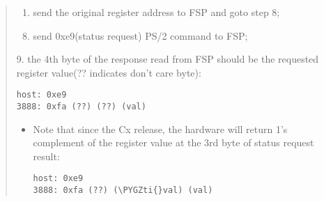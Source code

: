 \documentclass[a4paper,8pt,english]{sphinxmanual}
\def\PYGZti{\char`\~}
\begin{document}
\begin{quote}
\begin{enumerate}
\end{enumerate}
\begin{enumerate}
\item {} 
send the original register address to FSP and goto step 8;

\end{enumerate}
\begin{enumerate}
\setcounter{enumi}{7}
\item {} 
send 0xe9(status request) PS/2 command to FSP;

\end{enumerate}

9. the 4th byte of the response read from FSP should be the
requested register value(?? indicates don't care byte):

\begin{Verbatim}[commandchars=\\\{\}]
host: 0xe9
3888: 0xfa (??) (??) (val)
\end{Verbatim}
\begin{itemize}
\item {} 
Note that since the Cx release, the hardware will return 1's
complement of the register value at the 3rd byte of status request
result:

\begin{Verbatim}[commandchars=\\\{\}]
host: 0xe9
3888: 0xfa (??) (\PYGZti{}val) (val)
\end{Verbatim}

\end{itemize}
\end{quote}
\end{document}

